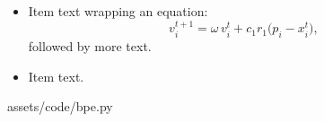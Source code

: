 \begin{itemize}[itemsep=0.4em]
    \item Item text wrapping an equation:
          \begin{equation}
              v_i^{t+1} = \omega\, v_i^{t} + c_1 r_1 \bigl(p_i - x_i^{t}\bigr),
              \label{eq:example:inline}
          \end{equation}
          followed by more text.
    \item Item text.
\end{itemize}

%
{assets/code/bpe.py}



